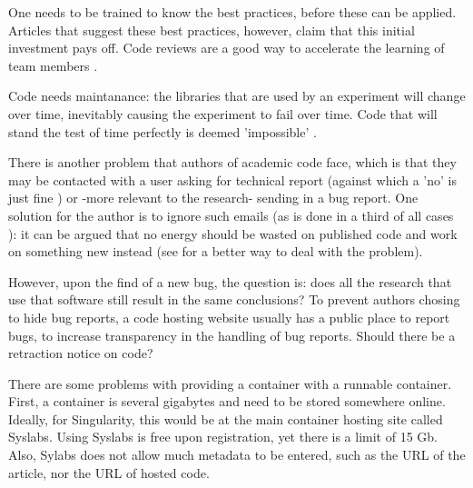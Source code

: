 One needs to be trained to know the best practices,
before these can be applied. 
Articles that suggest these best practices, however, claim that this initial
investment pays off.
Code reviews are a good way to accelerate the 
learning of team members \cite{vable2021code}.


Code needs maintanance:
the libraries that are used by an experiment
will change over time, inevitably causing the experiment to fail
over time. 
Code that will stand the test of time perfectly 
is deemed 'impossible' \cite{benureau2018re}.


There is another problem that authors of academic code face,
which is that they may be contacted with a user 
asking for technical report 
(against which a 'no' is just fine \cite{barnes2010publish})
or -more relevant to the research- sending in a bug report.
One solution for the author is to ignore such emails (as is done in a third
of all cases \cite{teunis2015corresponding}):
it can be argued that no energy should be wasted on published code
and work on something new instead 
(see \cite{barnes2010publish} for a better way to deal with the problem).




However, upon the find of a new bug, the question is:
does all the research that use that software still 
result in the same conclusions?
To prevent authors chosing to hide bug reports, 
a code hosting website usually has a public place to report bugs,
to increase transparency in the handling of bug reports.
Should there be a retraction notice on code?


There are some problems with providing a container with a runnable container.
First, a container is several gigabytes and need to be stored somewhere
online. 
Ideally, for Singularity, this would be at the main container hosting
site called Syslabs. Using Syslabs is free upon registration, 
yet there is a limit of 15 Gb. Also, Sylabs does not allow much metadata to
be entered, such as the URL of the article, nor the URL of hosted code.

